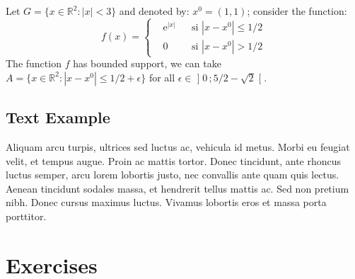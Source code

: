 \documentclass[
	11pt, %
	fleqn, %
	a4paper, %
]{LegrandOrangeBook}
\begin{document}
\begin{example} %
	Let $G=\{x\in\mathbb{R}^2:|x|<3\}$ and denoted by: $x^0=(1,1)$; consider the function:
	\begin{equation}
		f(x)=\left\{\begin{aligned}                                                                                                                                                                                                                                                                                                                                                      & \mathrm{e}^{|x|} &  & \text{si $|x-x^0|\leq 1/2$} \\
                                                                                                                                                                                                                                                                                                                                                                     & 0                &  & \text{si $|x-x^0|> 1/2$}\end{aligned}\right.
	\end{equation}
	The function $f$ has bounded support, we can take $A=\{x\in\mathbb{R}^2:|x-x^0|\leq 1/2+\epsilon\}$ for all $\epsilon\in\mathopen{]}0\,;5/2-\sqrt{2}\mathclose{[}$.
\end{example}

\subsection{Text Example}

\begin{example}[Example name] %
	Aliquam arcu turpis, ultrices sed luctus ac, vehicula id metus. Morbi eu feugiat velit, et tempus augue. Proin ac mattis tortor. Donec tincidunt, ante rhoncus luctus semper, arcu lorem lobortis justo, nec convallis ante quam quis lectus. Aenean tincidunt sodales massa, et hendrerit tellus mattis ac. Sed non pretium nibh. Donec cursus maximus luctus. Vivamus lobortis eros et massa porta porttitor.
\end{example}


\section{Exercises}
\end{document}
